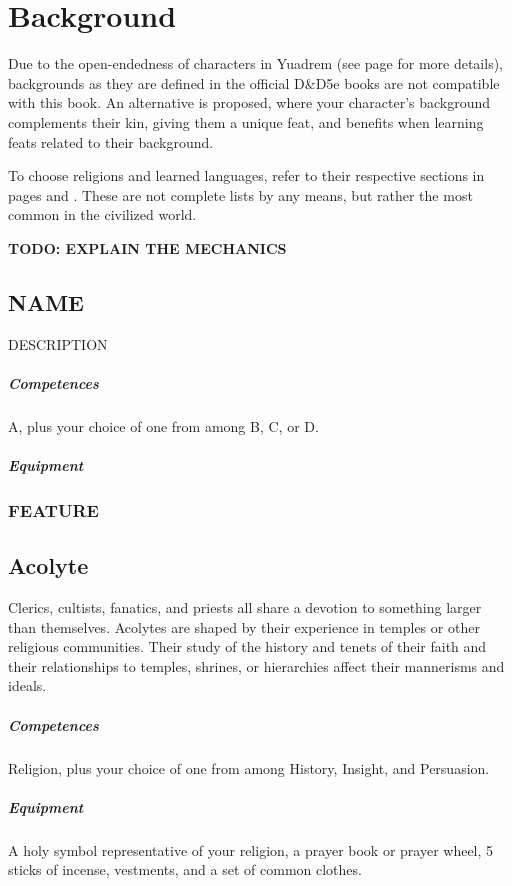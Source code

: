\section{Background}
Due to the open-endedness of characters in Yuadrem (see page \pageref{sec::classlessdnd} for more details), backgrounds as they are defined in the official D\&D5e books are not compatible with this book.
An alternative is proposed, where your character's background complements their kin, giving them a unique feat, and benefits when learning feats related to their background.

To choose religions and learned languages, refer to their respective sections in pages \pageref{ssec::religions} and \pageref{ssec::languages}.
These are not complete lists by any means, but rather the most common in the civilized world. %

\pagebreak



\textbf{TODO: EXPLAIN THE MECHANICS}

\subsection*{NAME} \label{ssec::name}
    DESCRIPTION
    \subparagraph{Competences} A, plus your choice of one from among B, C, or D.
    \subparagraph{Equipment}
    \subsubsection{FEATURE}

\subsection*{Acolyte} \label{ssec::acolyte}
    Clerics, cultists, fanatics, and priests all share a devotion to something larger than themselves.
    Acolytes are shaped by their experience in temples or other religious communities.
    Their study of the history and tenets of their faith and their relationships to temples, shrines, or hierarchies affect their mannerisms and ideals.
    \subparagraph{Competences} Religion, plus your choice of one from among History, Insight, and Persuasion.
    \subparagraph{Equipment} A holy symbol representative of your religion, a prayer book or prayer wheel, 5 sticks of incense, vestments, and a set of common clothes.
